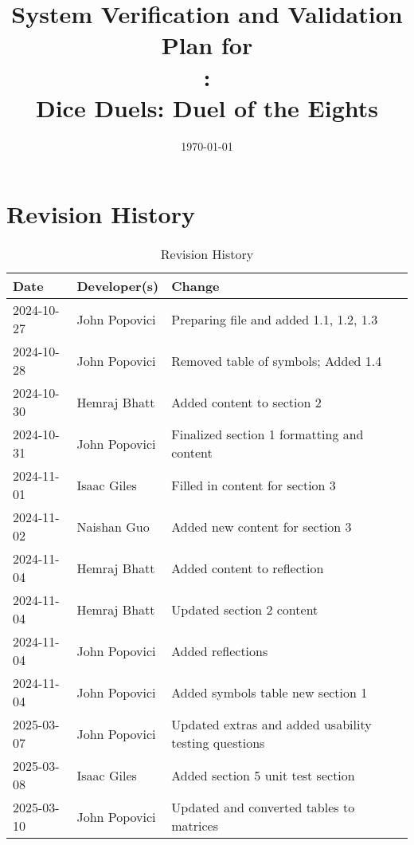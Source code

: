 \documentclass[12pt, titlepage]{article}
\begin{document}
\title{System Verification and Validation Plan for \\\progname: \\Dice Duels: Duel of the Eights} 
\author{\authname}
\date{\today}
	
\maketitle


\section*{Revision History}

\begin{table}[hp]
\caption{Revision History} \label{TblRevisionHistory}
\begin{tabularx}{\textwidth}{llX}
\toprule
\textbf{Date} & \textbf{Developer(s)} & \textbf{Change}\\
\midrule
2024-10-27 & John Popovici & Preparing file and added 1.1, 1.2, 1.3\\
2024-10-28 & John Popovici & Removed table of symbols; Added 1.4\\
2024-10-30 & Hemraj Bhatt & Added content to section 2\\
2024-10-31 & John Popovici & Finalized section 1 formatting and content\\
2024-11-01 & Isaac Giles & Filled in content for section 3\\
2024-11-02 & Naishan Guo & Added new content for section 3\\
2024-11-04 & Hemraj Bhatt & Added content to reflection \\
2024-11-04 & Hemraj Bhatt & Updated section 2 content \\
2024-11-04 & John Popovici & Added reflections \\
2024-11-04 & John Popovici & Added symbols table new section 1 \\
2025-03-07 & John Popovici & Updated extras and added usability testing questions \\
2025-03-08 & Isaac Giles & Added section 5 unit test section \\
2025-03-10 & John Popovici & Updated and converted tables to matrices \\
\bottomrule
\end{tabularx}
\end{table}

~\\
\iffalse
{}
\end{document}
